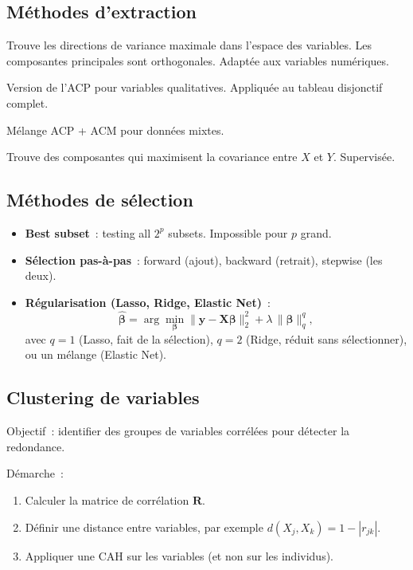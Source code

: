 \documentclass[a4paper,11pt]{article}
\theoremstyle{definition}
\theoremstyle{remark}
\begin{document}
\subsection{Méthodes d'extraction}

\begin{description}[style=nextline]
  \item[ACP (PCA)] Trouve les directions de variance maximale dans
    l'espace des variables. Les composantes principales sont
    orthogonales. Adaptée aux variables numériques.
  \item[ACM (MCA)] Version de l'ACP pour variables qualitatives.
    Appliquée au tableau disjonctif complet.
  \item[AFDM (FAMD)] Mélange ACP + ACM pour données mixtes.
  \item[PLS (\textit{Partial Least Squares})] Trouve des composantes
    qui maximisent la covariance entre $X$ et $Y$. Supervisée.
\end{description}

\subsection{Méthodes de sélection}

\begin{itemize}
  \item \textbf{Best subset}~: testing all $2^p$ subsets. Impossible
    pour $p$ grand.
  \item \textbf{Sélection pas-à-pas}~: forward (ajout), backward
    (retrait), stepwise (les deux).
  \item \textbf{Régularisation (Lasso, Ridge, Elastic Net)}~:
    \[
    \hat{\boldsymbol{\beta}} = \arg\min_{\boldsymbol{\beta}}
    \| \mathbf{y} - \mathbf{X}\boldsymbol{\beta} \|_2^2
    + \lambda \, \|\boldsymbol{\beta}\|_q^q,
    \]
    avec $q=1$ (Lasso, fait de la sélection), $q=2$ (Ridge, réduit
    sans sélectionner), ou un mélange (Elastic Net).
\end{itemize}

\subsection{Clustering de variables}

Objectif~: identifier des groupes de variables corrélées pour détecter
la redondance.

Démarche~:
\begin{enumerate}
  \item Calculer la matrice de corrélation $\mathbf{R}$.
  \item Définir une distance entre variables, par exemple
    $d(X_j, X_k) = 1 - |r_{jk}|$.
  \item Appliquer une CAH sur les variables (et non sur les individus).
\end{enumerate}
\end{document}
